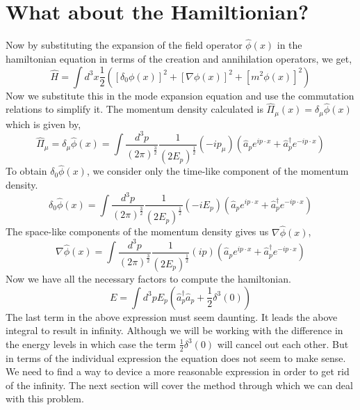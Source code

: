  \section{What about the Hamiltionian?}
 Now by substituting the expansion of the field operator $\hat{\phi}(x)$ in the hamiltonian equation in terms of the creation and annihilation operators, we get, 
 \begin{equation}
     \hat{H} = \int d^{3}x \frac{1}{2} ([\delta_{0}\phi(x)]^{2} +   [\nabla \phi(x)]^{2} +[ m^{2}\phi(x)]^{2})  
 \end{equation}
 Now we substitute this in the mode expansion equation and use the commutation relations to simplify it. The momentum density calculated is $\hat{\Pi}_{\mu}(x) = \delta _{\mu} \hat{\phi}(x) $ which is given by, 
 \begin{equation}
     \hat{\Pi}_{\mu} = \delta _{\mu} \hat{\phi}(x) =  \int\frac{d^{3}p}{(2\pi)^{\frac{3}{2}}} \frac{1}{(2 E_{p})^{\frac{1}{2}}} (-ip_{\mu}) (\hat{a}_{p}e^{ip \cdot x} + \hat{a}^{\dagger}_{p}e^{-ip \cdot x})
 \end{equation}
 To obtain $\delta _{0} \hat{\phi}(x)$,  we consider only the time-like component of the momentum density. 
 \begin{equation}
     \delta _{0} \hat{\phi}(x) = \int\frac{d^{3}p}{(2\pi)^{\frac{3}{2}}} \frac{1}{(2 E_{p})^{\frac{1}{2}}} (-iE_{p}) (\hat{a}_{p}e^{ip \cdot x} + \hat{a}^{\dagger}_{p}e^{-ip \cdot x})
 \end{equation}
 The space-like components of the momentum density gives us $\nabla \hat{\phi}(x)$, 
 \begin{equation}
     \nabla \hat{\phi}(x) = \int\frac{d^{3}p}{(2\pi)^{\frac{3}{2}}} \frac{1}{(2 E_{p})^{\frac{1}{2}}} (ip) (\hat{a}_{p}e^{ip \cdot x} + \hat{a}^{\dagger}_{p}e^{-ip \cdot x})
 \end{equation}
 Now we have all the necessary factors to compute the hamiltonian. 
 \begin{equation}
     E = \int d^{3} p E_{p} (\hat{a}^{\dagger}_{p}\hat{a}_{p} + \frac{1}{2}\delta^{3}(0))
 \end{equation}
 The last term in the above expression must seem daunting. It leads the above integral to result in infinity. Although we will be working with the difference in the energy levels in which case the term $\frac{1}{2}\delta^{3}(0)$ will cancel out each other. But in terms of the individual expression the equation does not seem to make sense. We need to find a way to device a more reasonable expression in order to get rid of the infinity. The next section will cover the method through which we can deal with this problem.
 
